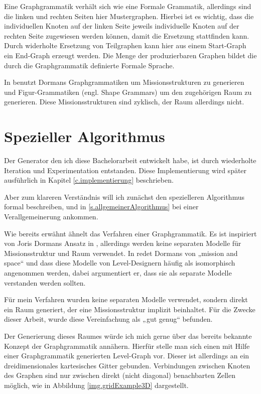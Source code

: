 Eine Graphgrammatik verhält sich wie eine Formale Grammatik, allerdings sind die linken und rechten Seiten hier Mustergraphen. Hierbei ist es wichtig, dass die individuellen Knoten auf der linken Seite jeweils individuelle Knoten auf der rechten Seite zugewiesen werden können, damit die Ersetzung stattfinden kann. 
\cite[Kap.~5.5.1, S.~80]{shaker2016procedural}
Durch widerholte Ersetzung von Teilgraphen kann hier aus einem Start-Graph ein End-Graph erzeugt werden. Die Menge der produzierbaren Graphen bildet die durch die Graphgrammatik definierte Formale Sprache. 

In \cite{dormansAdventures} benutzt Dormans Graphgrammatiken um Missionsstrukturen zu generieren und Figur-Grammatiken (engl. Shape Grammars) um den zugehörigen Raum zu generieren. Diese Missionsstrukturen sind zyklisch, der Raum allerdings nicht.

\section{Spezieller Algorithmus}\label{s.speziellerAlgorithmus}

Der Generator den ich diese Bachelorarbeit entwickelt habe, ist durch wiederholte Iteration und Experimentation entstanden. Diese Implementierung wird später ausführlich in Kapitel \ref{c.implementierung} beschrieben.

Aber zum klareren Verständnis will ich zunächst den spezielleren Algorithmus formal beschreiben, und in 
\ref{s.allgemeinerAlgorithmus} bei einer Verallgemeinerung ankommen. 

Wie bereits erwähnt ähnelt das Verfahren einer Graphgrammatik. Es ist inspiriert von Joris Dormans Ansatz in 
\cite{dormansAdventures},
allerdings werden keine separaten Modelle für Missionsstruktur und Raum verwendet.
In \cite[2.]{dormansModelTransformation} redet Dormans von „mission and space“ und dass diese Modelle von Level-Designern häufig als isomorphisch angenommen werden, dabei argumentiert er, dass sie als separate Modelle verstanden werden sollten.

Für mein Verfahren wurden keine separaten Modelle verwendet, sondern direkt ein Raum generiert, der eine Missionsstruktur implizit  beinhaltet. Für die Zwecke dieser Arbeit, wurde diese Vereinfachung als „gut genug“ befunden.

Der Generierung dieses Raumes würde ich mich gerne über das bereits bekannte Konzept der Graphgrammatik annähern. Hierfür stelle man sich einen mit Hilfe einer Graphgrammatik generierten Level-Graph vor. Dieser ist allerdings an ein dreidimensionales kartesisches Gitter gebunden. Verbindungen zwischen Knoten des Graphen sind nur zwischen direkt (nicht diagonal) benachbarten Zellen möglich, wie in Abbildung \ref{img.gridExample3D} dargestellt.

